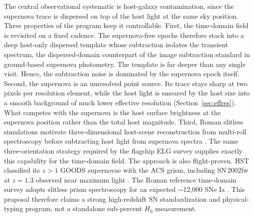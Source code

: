 \documentclass[10pt,onecolumn]{article}
\begin{document}
The central observational systematic is host-galaxy contamination, since the supernova trace is dispersed on top of the host light at the same sky position. Three properties of the program keep it controllable. First, the time-domain field is revisited on a fixed cadence. The supernova-free epochs therefore stack into a deep host-only dispersed template whose subtraction isolates the transient spectrum, the dispersed-domain counterpart of the image subtraction standard in ground-based supernova photometry. The template is far deeper than any single visit. Hence, the subtraction noise is dominated by the supernova epoch itself. Second, the supernova is an unresolved point source. Its trace stays sharp at two pixels per resolution element, while the host light is smeared by the host size into a smooth background of much lower effective resolution (Section~\ref{sec:effres}). What competes with the supernova is the host surface brightness at the supernova position rather than the total host magnitude. Third, Roman slitless simulations motivate three-dimensional host-scene reconstruction from multi-roll spectroscopy before subtracting host light from supernova spectra \cite{astraatmadja2026}. The same three-orientation strategy required by the flagship ELG survey supplies exactly this capability for the time-domain field. The approach is also flight-proven. HST classified its $z>1$ GOODS supernovae with the ACS grism, including SN\,2002fw at $z=1.3$ observed near maximum light \cite{riess2004}. The Roman reference time-domain survey adopts slitless prism spectroscopy for an expected $\sim$12{,}000 SNe Ia \cite{rose2021roman}. This proposal therefore claims a strong high-redshift SN standardization and physical-typing program, not a standalone sub-percent $H_0$ measurement.
\end{document}
